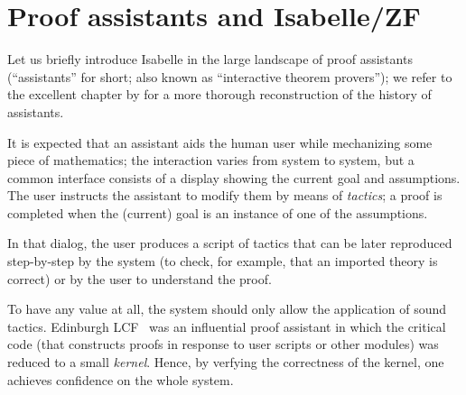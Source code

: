 \section{Proof assistants and Isabelle/ZF}
\label{sec:proof-assist-isabelle}

Let us briefly introduce Isabelle \cite{DBLP:books/sp/Paulson94} in the large landscape of proof
assistants (“assistants” for short; also known as “interactive theorem provers”); we refer to the
excellent chapter by \citet{DBLP:series/hhl/HarrisonUW14} for a more
thorough reconstruction of the history of assistants.

It is expected that an assistant aids the human user while mechanizing
some piece of mathematics; the interaction varies from system to
system, but a common interface consists of a display showing the
current goal and assumptions. The user instructs the assistant to
modify them by means of \emph{tactics}; a %
proof is completed when the (current) goal is an instance of one of
the assumptions.

In that dialog, the user produces a script of tactics that can be
later reproduced step-by-step by the system (to check, for example,
that an imported theory is correct) or by the user to understand
the proof.

To have any value at all, the system should only allow the application
of sound tactics.
Edinburgh LCF~\cite{Gordon1979-qm} was an
influential proof assistant in which the critical code (that
constructs proofs in response to user scripts or other modules) was reduced to a small
\emph{kernel}. Hence, by verfying the correctness of the kernel, one
achieves confidence on the whole system.

